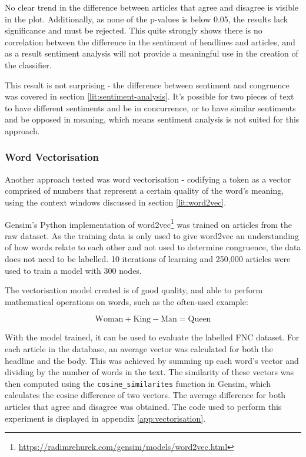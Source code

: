 No clear trend in the difference between articles that agree and disagree is visible in the plot. Additionally, as none of the p-values is below 0.05, the results lack significance and must be rejected. This quite strongly shows there is no correlation between the difference in the sentiment of headlines and articles, and as a result sentiment analysis will not provide a meaningful use in the creation of the classifier.

This result is not surprising - the difference between sentiment and congruence was covered in section \ref{lit:sentiment-analysis}. It's possible for two pieces of text to have different sentiments and be in concurrence, or to have similar sentiments and be opposed in meaning, which means sentiment analysis is not suited for this approach.

\subsubsection{Word Vectorisation}
Another approach tested was word vectorisation - codifying a token as a vector comprised of numbers that represent a certain quality of the word's meaning, using the context windows discussed in section \ref{lit:word2vec}.

Gensim's Python implementation of word2vec\footnote{\url{https://radimrehurek.com/gensim/models/word2vec.html}} was trained on articles from the raw dataset. As the training data is only used to give word2vec an understanding of how words relate to each other and not used to determine congruence, the data does not need to be labelled. 10 iterations of learning and 250,000 articles were used to train a model with 300 nodes.

The vectorisation model created is of good quality, and able to perform mathematical operations on words, such as the often-used example:

\[\textrm{Woman} + \textrm{King} - \textrm{Man} = \textrm{Queen}\]

With the model trained, it can be used to evaluate the labelled FNC dataset.
For each article in the database, an average vector was calculated for both the headline and the body. This was achieved by summing up each word's vector and dividing by the number of words in the text. The similarity of these vectors was then computed using the \texttt{cosine\_similarites} function in Gensim, which calculates the cosine difference of two vectors. The average difference for both articles that agree and disagree was obtained. The code used to perform this experiment is displayed in appendix \ref{app:vectorisation}.

